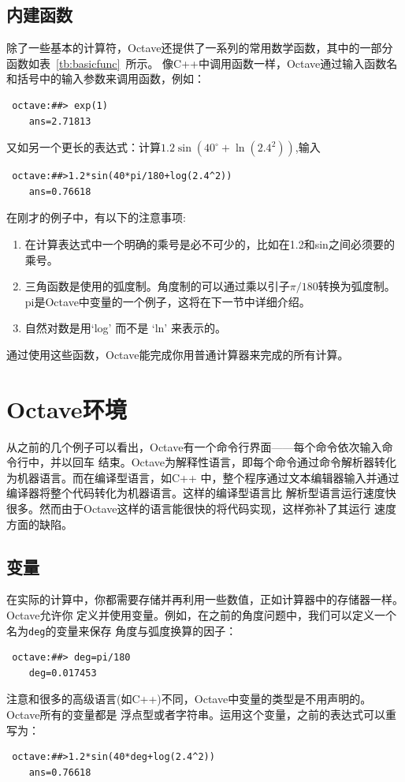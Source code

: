 \documentclass[UTF8,adobefonts]{ctexart}
\begin{document}
\subsection{内建函数}
除了一些基本的计算符，Octave还提供了一系列的常用数学函数，其中的一部分函数如表~\ref{tb:basicfunc}~所示。
像C++中调用函数一样，Octave通过输入函数名和括号中的输入参数来调用函数，例如：
\begin{verbatim}
 octave:##> exp(1)
    ans=2.71813
\end{verbatim}
又如另一个更长的表达式：计算$1.2\sin(40^\circ+\ln(2.4^2))$,输入
\begin{verbatim}
 octave:##>1.2*sin(40*pi/180+log(2.4^2))
    ans=0.76618
\end{verbatim}
在刚才的例子中，有以下的注意事项:
\begin{enumerate}
\item 在计算表达式中一个明确的乘号是必不可少的，比如在1.2和sin之间必须要的乘号。
\item 三角函数是使用的弧度制。角度制的可以通过乘以引子$\pi/180$转换为弧度制。
pi是Octave中变量的一个例子，这将在下一节中详细介绍。
\item 自然对数是用‘log’ 而不是 ‘ln’ 来表示的。
\end{enumerate}
通过使用这些函数，Octave能完成你用普通计算器来完成的所有计算。

\section{Octave环境}
从之前的几个例子可以看出，Octave有一个命令行界面——每个命令依次输入命令行中，并以回车
结束。Octave为解释性语言，即每个命令通过命令解析器转化为机器语言。而在编译型语言，如C++
中，整个程序通过文本编辑器输入并通过编译器将整个代码转化为机器语言。这样的编译型语言比
解析型语言运行速度快很多。然而由于Octave这样的语言能很快的将代码实现，这样弥补了其运行
速度方面的缺陷。
\subsection{变量}
在实际的计算中，你都需要存储并再利用一些数值，正如计算器中的存储器一样。Octave允许你
定义并使用变量。例如，在之前的角度问题中，我们可以定义一个名为{\tt deg}的变量来保存
角度与弧度换算的因子：
\begin{verbatim}
 octave:##> deg=pi/180
    deg=0.017453
\end{verbatim}

注意和很多的高级语言(如C++)不同，Octave中变量的类型是不用声明的。Octave所有的变量都是
浮点型或者字符串。运用这个变量，之前的表达式可以重写为：
\begin{verbatim}
 octave:##>1.2*sin(40*deg+log(2.4^2))
    ans=0.76618
\end{verbatim}
\end{document}
